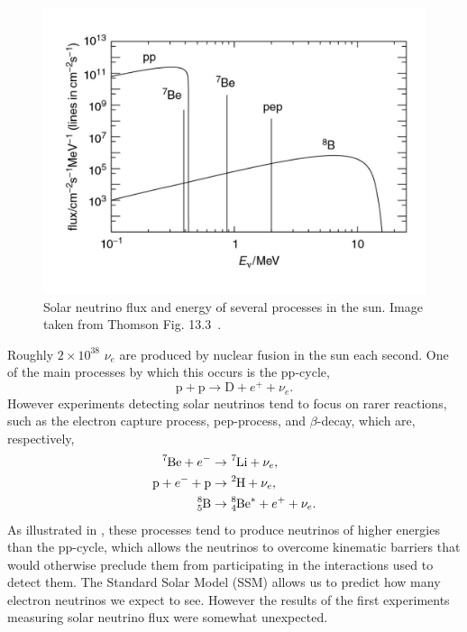 \begin{figure}
  \centering
  \includegraphics[height=0.33\textheight,keepaspectratio]
                {pictures/t13_3.pdf}
  \caption{Solar neutrino flux and energy of several processes in the sun.
           Image taken from Thomson Fig. 13.3~\cite{thomson_modern_2013}.}
  \label{fig:solar}
\end{figure}
Roughly $2\times10^{38}$ $\nu_e$ are produced by nuclear fusion in the sun
each second. One of the main processes by which this occurs is the pp-cycle,
\begin{equation}
 \text{p}+\text{p}\to\text{D}+e^++\nu_e.
\end{equation} However experiments detecting
solar neutrinos tend to focus on rarer reactions, such as the
 electron capture process, pep-process, and
 $\beta$-decay, which are, respectively,
\begin{equation}
  \begin{aligned}
    \ce{^7Be}+e^-&\to\ce{^7Li}+\nu_e,
    \\
    \text{p}+e^-+\text{p}&\to\ce{^2H}+\nu_e, 
    \\
    \ce{^8_5B}&\to\ce{^8_4Be}^*+e^++\nu_e.
  \end{aligned}
\end{equation}
As illustrated in , these processes tend to produce 
neutrinos of higher
energies than the pp-cycle, which allows the neutrinos to overcome kinematic
barriers that would otherwise preclude them from participating in the
interactions used to detect them.
The Standard Solar Model (SSM) allows us to predict how many electron neutrinos
we expect to see. However the results of the first experiments measuring solar
neutrino flux were somewhat unexpected.

